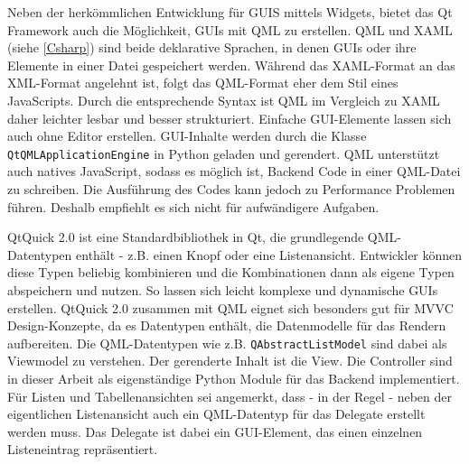 Neben der herkömmlichen Entwicklung für GUIS mittels Widgets,  bietet das Qt Framework auch die Möglichkeit, GUIs mit QML zu erstellen.
QML und XAML (siehe \ref{Csharp}) sind beide deklarative Sprachen, in denen GUIs oder ihre Elemente in einer Datei gespeichert werden.
Während das XAML-Format an das XML-Format angelehnt ist, folgt das QML-Format eher dem Stil eines JavaScripts.
Durch die entsprechende Syntax ist QML im Vergleich zu XAML daher leichter lesbar und besser strukturiert.
Einfache GUI-Elemente lassen sich auch ohne Editor erstellen.
GUI-Inhalte werden durch die Klasse \verb|QtQMLApplicationEngine| in Python geladen und gerendert. 
QML unterstützt auch natives JavaScript, sodass es möglich ist, Backend Code in einer QML-Datei zu schreiben. 
Die Ausführung des Codes kann jedoch zu Performance Problemen führen. 
Deshalb empfiehlt es sich nicht für aufwändigere Aufgaben.

QtQuick 2.0 ist eine Standardbibliothek in Qt, die grundlegende QML-Datentypen enthält - z.B. einen Knopf oder eine Listenansicht.
Entwickler können diese Typen beliebig kombinieren und die Kombinationen dann als eigene Typen abspeichern und nutzen. 
So lassen sich leicht komplexe und dynamische GUIs erstellen. 
QtQuick 2.0 zusammen mit QML eignet sich besonders gut für MVVC Design-Konzepte, da es Datentypen enthält, die Datenmodelle für das Rendern aufbereiten. Die QML-Datentypen wie z.B. \verb|QAbstractListModel| sind dabei als Viewmodel zu verstehen. Der gerenderte Inhalt ist die View.
Die Controller sind in dieser Arbeit als eigenständige Python Module für das Backend implementiert.
Für Listen und Tabellenansichten sei angemerkt, dass - in der Regel - neben der eigentlichen Listenansicht auch ein QML-Datentyp für das Delegate erstellt werden muss. Das Delegate ist dabei ein GUI-Element, das einen einzelnen Listeneintrag repräsentiert.
